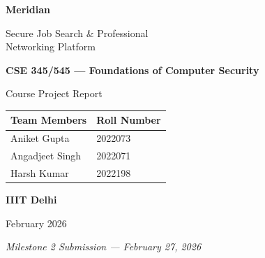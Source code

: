 \documentclass[12pt, a4paper]{article}
\begin{document}
\begin{titlepage}
    \centering
    \vspace*{2cm}

    {\Huge\bfseries\textcolor{meridiandark}{Meridian}\par}
    \vspace{0.5cm}
    {\Large\textcolor{meridianblue}{Secure Job Search \& Professional\\Networking Platform}\par}

    \vspace{2cm}

    {\large\textbf{CSE 345/545 — Foundations of Computer Security}\par}
    {\large Course Project Report\par}

    \vspace{1.5cm}

    \begin{tabular}{ll}
        \toprule
        \textbf{Team Members} & \textbf{Roll Number} \\
        \midrule
        Aniket Gupta    & 2022073 \\
        Angadjeet Singh & 2022071 \\
        Harsh Kumar     & 2022198 \\
        \bottomrule
    \end{tabular}

    \vspace{2cm}

    {\large\textbf{IIIT Delhi}\par}
    {\large February 2026\par}

    \vspace{1cm}

    \textit{Milestone 2 Submission — February 27, 2026}

\end{titlepage}

\newpage
\tableofcontents
\newpage


\newpage

\newpage

\newpage

\newpage

\newpage

\newpage

\end{document}
